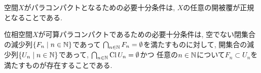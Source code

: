 \documentclass[uplatex, dvipdfmx, a4paper, 12pt, class=jsbook, crop=false]{standalone}
\begin{document}
\begin{theorem}
	 空間$ X $がパラコンパクトとなるための必要十分条件は, $ X $の任意の開被覆が正規となることである.
\end{theorem}

\begin{theorem}
	位相空間$ X $が可算パラコンパクトであるための必要十分条件は,
	空でない閉集合の減少列$ \setcomp{F_n}{n \in \N} $であって
	$ \bigcap_{n \in \mathbb{N}} F_n = \emptyset $を満たすものに対して,
	開集合の減少列$ \setcomp{U_n}{n \in \N} $であって,
	$ \bigcap_{n \in \mathbb{N}} \mathop{\mathrm{Cl}}\nolimits U_n = \emptyset $かつ
	任意の$ n \in \mathbb{N} $について$ F_n \subset U_n $を満たすものが存在することである.
\end{theorem}
\end{document}

